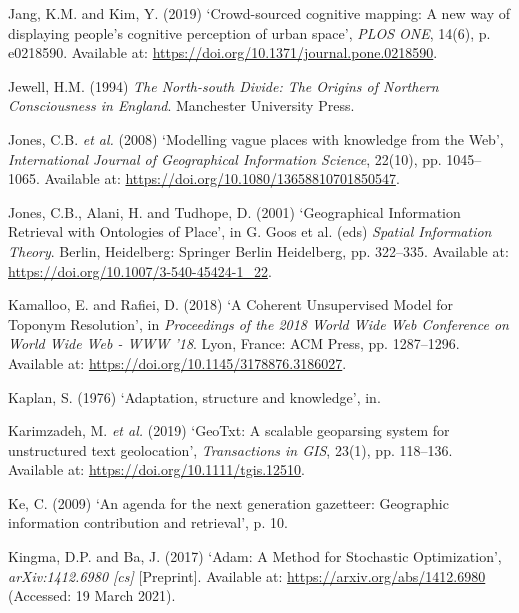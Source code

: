 \documentclass[
  letterpaper,
  11pt,
  english,
  onehalfspacing,
  headsepline]{MastersDoctoralThesis}
\newlength{\cslhangindent}
\newlength{\cslentryspacingunit} %
\newenvironment{CSLReferences}[2] %
 {%
  \setlength{\parindent}{0pt}
  \ifodd #1
  \let\oldpar\par
  \def\par{\hangindent=\cslhangindent\oldpar}
  \fi
  \setlength{\parskip}{#2\cslentryspacingunit}
 }%
 {}
\begin{document}
\begin{CSLReferences}{0}{0}
\leavevmode{}%
Jang, K.M. and Kim, Y. (2019) {`Crowd-sourced cognitive mapping: {A} new
way of displaying people's cognitive perception of urban space'},
\emph{PLOS ONE}, 14(6), p. e0218590. Available at:
\url{https://doi.org/10.1371/journal.pone.0218590}.

\leavevmode{}%
Jewell, H.M. (1994) \emph{The {North-south Divide}: {The Origins} of
{Northern Consciousness} in {England}}. {Manchester University Press}.

\leavevmode{}%
Jones, C.B. \emph{et al.} (2008) {`Modelling vague places with knowledge
from the {Web}'}, \emph{International Journal of Geographical
Information Science}, 22(10), pp. 1045--1065. Available at:
\url{https://doi.org/10.1080/13658810701850547}.

\leavevmode{}%
Jones, C.B., Alani, H. and Tudhope, D. (2001) {`Geographical
{Information Retrieval} with {Ontologies} of {Place}'}, in G. Goos et
al. (eds) \emph{Spatial {Information Theory}}. {Berlin, Heidelberg}:
{Springer Berlin Heidelberg}, pp. 322--335. Available at:
\url{https://doi.org/10.1007/3-540-45424-1_22}.

\leavevmode{}%
Kamalloo, E. and Rafiei, D. (2018) {`A {Coherent Unsupervised Model} for
{Toponym Resolution}'}, in \emph{Proceedings of the 2018 {World Wide Web
Conference} on {World Wide Web} - {WWW} '18}. {Lyon, France}: {ACM
Press}, pp. 1287--1296. Available at:
\url{https://doi.org/10.1145/3178876.3186027}.

\leavevmode{}%
Kaplan, S. (1976) {`Adaptation, structure and knowledge'}, in.

\leavevmode{}%
Karimzadeh, M. \emph{et al.} (2019) {`{GeoTxt}: {A} scalable geoparsing
system for unstructured text geolocation'}, \emph{Transactions in GIS},
23(1), pp. 118--136. Available at:
\url{https://doi.org/10.1111/tgis.12510}.

\leavevmode{}%
Ke, C. (2009) {`An agenda for the next generation gazetteer: Geographic
information contribution and retrieval'}, p. 10.

\leavevmode{}%
Kingma, D.P. and Ba, J. (2017) {`Adam: {A Method} for {Stochastic
Optimization}'}, \emph{arXiv:1412.6980 {[}cs{]}} {[}Preprint{]}.
Available at: \url{https://arxiv.org/abs/1412.6980} (Accessed: 19 March
2021).


\end{CSLReferences}
\end{document}
